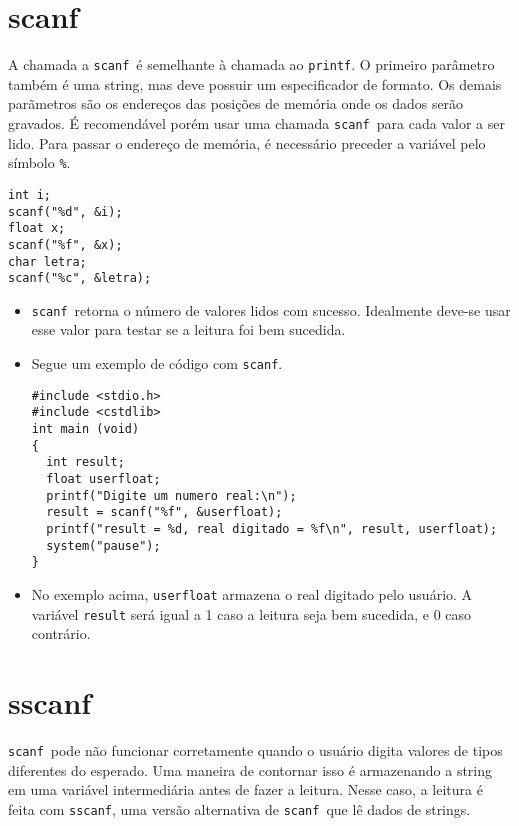 \documentclass{book}
\newcommand{\PRINTF}{{\tt printf}}
\newcommand{\SCANF}{{\tt scanf}}
\newcommand{\SSCANF}{{\tt sscanf}}
\begin{document}
\section{scanf}
\label{sec:scanf}

A chamada a \SCANF\ é semelhante à chamada ao \PRINTF. O primeiro parâmetro também é uma string, mas deve possuir um especificador de formato. Os demais parãmetros são os endereços das posições de memória onde os dados serão gravados. É recomendável porém usar uma chamada \SCANF\ para cada valor a ser lido. Para passar o endereço de memória, é necessário preceder a variável pelo símbolo {\tt \%}.

\begin{lstlisting}
int i;
scanf("%d", &i);
float x;
scanf("%f", &x);
char letra;
scanf("%c", &letra);
\end{lstlisting}

\begin{itemize}

\item \SCANF\ retorna o número de valores lidos com sucesso. Idealmente deve-se usar esse valor para testar se a leitura foi bem sucedida.

\item Segue um exemplo de código com \SCANF.

\begin{lstlisting}
#include <stdio.h> 
#include <cstdlib> 
int main (void)
{
  int result;
  float userfloat;
  printf("Digite um numero real:\n");
  result = scanf("%f", &userfloat);
  printf("result = %d, real digitado = %f\n", result, userfloat);
  system("pause");
}
\end{lstlisting}

\item No exemplo acima, {\tt userfloat} armazena o real digitado pelo usuário. A variável {\tt result} será igual a 1 caso a leitura seja bem sucedida, e 0 caso contrário.

\end{itemize}


\section{sscanf}
\label{sec:sscanf}

\SCANF\ pode não funcionar corretamente quando o usuário digita valores de tipos diferentes do esperado. Uma maneira de contornar isso é armazenando a string em uma variável intermediária antes de fazer a leitura. Nesse caso, a leitura é feita com \SSCANF, uma versão alternativa de \SCANF\ que lê dados de strings.
\end{document}
